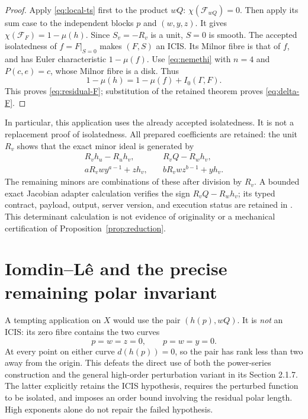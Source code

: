 \documentclass[11pt]{article}
\newcommand{\MF}{\mathcal F}
\begin{document}
\begin{proof}
Apply \eqref{eq:local-ts} first to the product \(wQ\):
\(\chi(\MF_{wQ})=0\).  Then apply its sum case to the
independent blocks \(p\) and \((w,y,z)\).  It gives
\(\chi(\MF_F)=1-\mu(h)\).
Since \(S_v=-R_v\) is a unit, \(S=0\) is smooth.
The accepted isolatedness of \(f=F|_{S=0}\) makes
\((F,S)\) an ICIS.  Its Milnor fibre is that of \(f\), and has
Euler characteristic \(1-\mu(f)\).
Use \eqref{eq:nemethi} with \(n=4\) and \(P(c,e)=c\), whose
Milnor fibre is a disk.  Thus
\[
 1-\mu(h)=1-\mu(f)+I_0(\Gamma,F).
\]
This proves \eqref{eq:residual-F}; substitution of the retained
theorem proves \eqref{eq:delta-F}.
\end{proof}

In particular, this application uses the already accepted
isolatedness.  It is not a replacement proof of isolatedness.
All prepared coefficients are retained: the unit \(R_v\) shows
that the exact minor ideal is generated by
\begin{equation}\label{eq:minors}
\begin{split}
 R_vh_u-R_uh_v,\quad &R_vQ-R_wh_v,\\
 aR_vwy^{a-1}+zh_v,\quad &bR_vwz^{b-1}+yh_v.
\end{split}
\end{equation}
The remaining minors are combinations of these after division
by \(R_v\).  A bounded exact Jacobian adapter calculation verifies
the sign \(R_vQ-R_wh_v\); its typed contract, payload, output,
server version, and execution status are retained in
.
This determinant calculation is not evidence of originality or
a mechanical certification of Proposition~\ref{prop:reduction}.

\section{Iomdin--L\^e and the precise remaining polar invariant}

A tempting application on \(X\) would use the pair
\((h(p),wQ)\).  It is \emph{not} an ICIS: its zero fibre contains
the two curves
\[
 p=w=z=0,\qquad p=w=y=0.
\]
At every point on either curve \(d(h(p))=0\), so the pair has
rank less than two away from the origin.  This defeats the
direct use of both the power-series construction
\cite[Section 2.1.4]{nemethi79} and the general high-order
perturbation variant in its Section 2.1.7.  The latter
explicitly retains the ICIS hypothesis, requires the perturbed
function to be isolated, and imposes an order bound involving
the residual polar length.  High exponents alone do not repair
the failed hypothesis.
\end{document}
